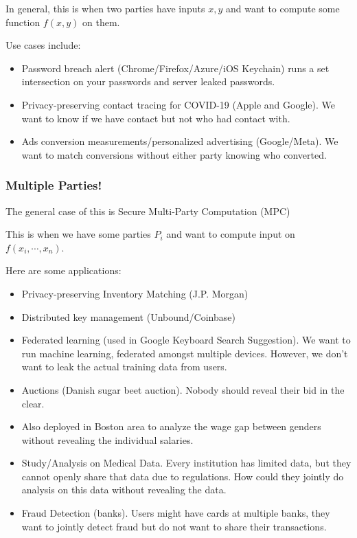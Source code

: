 
In general, this is when two parties have inputs $x, y$ and want to compute some function $f(x, y)$ on them.

Use cases include:
\begin{itemize}
    \item Password breach alert (Chrome/Firefox/Azure/iOS Keychain) runs a set intersection on your passwords and server leaked passwords.
    \item Privacy-preserving contact tracing for COVID-19 (Apple and Google). We want to know if we have contact but not who had contact with.
    \item Ads conversion measurements/personalized advertising (Google/Meta). We want to match conversions without either party knowing who converted.
\end{itemize}

\subsubsection{Multiple Parties!}
The general case of this is Secure Multi-Party Computation (MPC)


This is when we have some parties $P_i$ and want to compute input on $f(x_i, \cdots, x_n)$.

Here are some applications:
\begin{itemize}
    \item Privacy-preserving Inventory Matching (J.P. Morgan)
    \item Distributed key management (Unbound/Coinbase)
    \item Federated learning (used in Google Keyboard Search Suggestion). We want to run machine learning, federated amongst multiple devices. However, we don't want to leak the actual training data from users.
    \item Auctions (Danish sugar beet auction). Nobody should reveal their bid in the clear.
    \item Also deployed in Boston area to analyze the wage gap between genders without revealing the individual salaries.
    \item Study/Analysis on Medical Data. Every institution has limited data, but they cannot openly share that data due to regulations. How could they jointly do analysis on this data without revealing the data.
    \item Fraud Detection (banks). Users might have cards at multiple banks, they want to jointly detect fraud but do not want to share their transactions.
\end{itemize}

